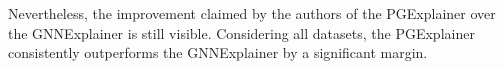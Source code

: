 Nevertheless, the improvement claimed by the authors of the PGExplainer over the GNNExplainer is still visible. Considering all datasets, the PGExplainer consistently outperforms the GNNExplainer by a significant margin. 







